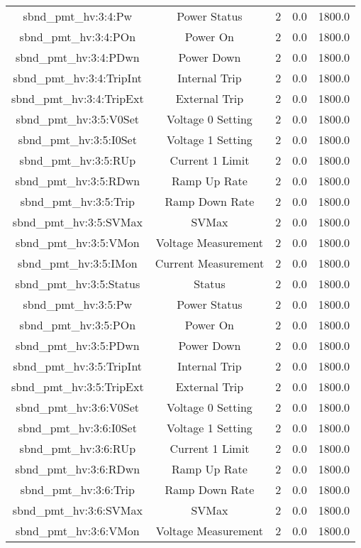 \begin{center}
\begin{longtable}{c | c c c c }
sbnd\_pmt\_hv:3:4:Pw & Power Status & 2 & 0.0 & 1800.0\\ 
sbnd\_pmt\_hv:3:4:POn & Power On & 2 & 0.0 & 1800.0\\ 
sbnd\_pmt\_hv:3:4:PDwn & Power Down & 2 & 0.0 & 1800.0\\ 
sbnd\_pmt\_hv:3:4:TripInt & Internal Trip & 2 & 0.0 & 1800.0\\ 
sbnd\_pmt\_hv:3:4:TripExt & External Trip & 2 & 0.0 & 1800.0\\ 
sbnd\_pmt\_hv:3:5:V0Set & Voltage 0 Setting & 2 & 0.0 & 1800.0\\ 
sbnd\_pmt\_hv:3:5:I0Set & Voltage 1 Setting & 2 & 0.0 & 1800.0\\ 
sbnd\_pmt\_hv:3:5:RUp & Current 1 Limit & 2 & 0.0 & 1800.0\\ 
sbnd\_pmt\_hv:3:5:RDwn & Ramp Up Rate & 2 & 0.0 & 1800.0\\ 
sbnd\_pmt\_hv:3:5:Trip & Ramp Down Rate & 2 & 0.0 & 1800.0\\ 
sbnd\_pmt\_hv:3:5:SVMax & SVMax & 2 & 0.0 & 1800.0\\ 
sbnd\_pmt\_hv:3:5:VMon & Voltage Measurement & 2 & 0.0 & 1800.0\\ 
sbnd\_pmt\_hv:3:5:IMon & Current Measurement & 2 & 0.0 & 1800.0\\ 
sbnd\_pmt\_hv:3:5:Status & Status & 2 & 0.0 & 1800.0\\ 
sbnd\_pmt\_hv:3:5:Pw & Power Status & 2 & 0.0 & 1800.0\\ 
sbnd\_pmt\_hv:3:5:POn & Power On & 2 & 0.0 & 1800.0\\ 
sbnd\_pmt\_hv:3:5:PDwn & Power Down & 2 & 0.0 & 1800.0\\ 
sbnd\_pmt\_hv:3:5:TripInt & Internal Trip & 2 & 0.0 & 1800.0\\ 
sbnd\_pmt\_hv:3:5:TripExt & External Trip & 2 & 0.0 & 1800.0\\ 
sbnd\_pmt\_hv:3:6:V0Set & Voltage 0 Setting & 2 & 0.0 & 1800.0\\ 
sbnd\_pmt\_hv:3:6:I0Set & Voltage 1 Setting & 2 & 0.0 & 1800.0\\ 
sbnd\_pmt\_hv:3:6:RUp & Current 1 Limit & 2 & 0.0 & 1800.0\\ 
sbnd\_pmt\_hv:3:6:RDwn & Ramp Up Rate & 2 & 0.0 & 1800.0\\ 
sbnd\_pmt\_hv:3:6:Trip & Ramp Down Rate & 2 & 0.0 & 1800.0\\ 
sbnd\_pmt\_hv:3:6:SVMax & SVMax & 2 & 0.0 & 1800.0\\ 
sbnd\_pmt\_hv:3:6:VMon & Voltage Measurement & 2 & 0.0 & 1800.0\\ 

\end{longtable}
\end{center}
